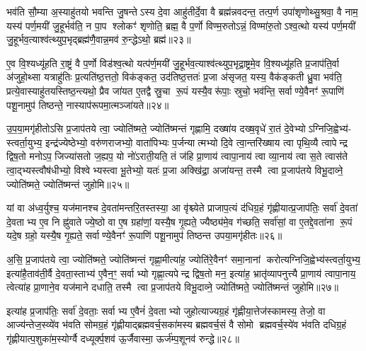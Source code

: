 भव॑ति सौ॒म्या अ॒स्याहु॑तयो भवन्ति जु॒षन्तेऽस्य दे॒वा आहु॑तीर्दे॒वा वै ब्रह्म॑न्नवदन्त॒ तत्प॒र्ण उपा॑शृणोथ्सु॒श्रवा॒ वै नाम॒ यस्य॑ पर्ण॒मयी॑ जु॒हूर्भव॑ति॒ न पा॒प श्लोकꣳ॑ शृणोति॒ ब्रह्म॒ वै प॒र्णो विण्म॒रुतोऽन्नं॒ विण्मा॑रु॒तोऽश्व॒त्थो यस्य॑ पर्ण॒मयी॑ जु॒हूर्भव॒त्याश्व॑त्थ्युप॒भृद्ब्रह्म॑णै॒वान्न॒मव॑ रु॒न्द्धेऽथो॒ ब्रह्म॑॥२३॥

ए॒व वि॒श्यध्यू॑हति रा॒ष्ट्रं वै प॒र्णो विड॑श्व॒त्थो यत्प॑र्ण॒मयी॑ जु॒हूर्भव॒त्याश्व॑त्थ्युप॒भृद्रा॒ष्ट्रमे॒व वि॒श्यध्यू॑हति प्र॒जाप॑ति॒र्वा अ॑जुहो॒थ्सा यत्राहु॑तिः प्र॒त्यति॑ष्ठ॒त्ततो॒ विक॑ङ्कत॒ उद॑तिष्ठ॒त्ततः॑ प्र॒जा अ॑सृजत॒ यस्य॒ वैक॑ङ्कती ध्रु॒वा भव॑ति॒ प्रत्ये॒वास्याहु॑तयस्तिष्ठ॒न्त्यथो॒ प्रैव जा॑यत ए॒तद्वै स्रु॒चा रू॒पं यस्यै॒वरू॑पाः॒ स्रुचो॒ भव॑न्ति॒ सर्वाण्ये॒वैनꣳ॑ रू॒पाणि॑ पशू॒नामुप॑ तिष्ठन्ते॒ नास्याप॑रूपमा॒त्मञ्जा॑यते॥२४॥

{\anuvakamend[{जु॒हूरथो॒ ब्रह्म॑ स्रु॒चा स॒प्तद॑श च॥७॥}]}

उ॒प॒या॒मगृ॑हीतोऽसि प्र॒जाप॑तये त्वा॒ ज्योति॑ष्मते॒ ज्योति॑ष्मन्तं गृह्णामि॒ दख्षा॑य दख्ष॒वृधे॑ रा॒तं दे॒वेभ्योऽग्निजि॒ह्वेभ्य॑- स्त्वर्ता॒युभ्य॒ इन्द्र॑ज्येष्ठेभ्यो॒ वरु॑णराजभ्यो॒ वाता॑पिभ्यः प॒र्जन्यात्मभ्यो दि॒वे त्वा॒न्तरि॑ख्षाय त्वा पृथि॒व्यै त्वापेन्द्र द्विष॒तो मनोऽप॒ जिज्या॑सतो ज॒ह्यप॒ यो नो॑ऽराती॒यति॒ तं ज॑हि प्रा॒णाय॑ त्वापा॒नाय॑ त्वा व्या॒नाय॑ त्वा स॒ते त्वास॑ते त्वा॒द्भ्यस्त्वौष॑धीभ्यो॒ विश्वेभ्यस्त्वा भू॒तेभ्यो॒ यतः॑ प्र॒जा अक्खि॑द्रा॒ अजा॑यन्त॒ तस्मै त्वा प्र॒जाप॑तये विभू॒दाव्ने॒ ज्योति॑ष्मते॒ ज्योति॑ष्मन्तं जुहोमि॥२५॥

{\anuvakamend[{ओष॑धीभ्य॒श्चतु॑र्दश च॥८॥}]}

यां वा अ॑ध्व॒र्युश्च॒ यज॑मानश्च दे॒वता॑मन्तरि॒तस्तस्या॒ आ वृ॑श्च्येते प्राजाप॒त्यं द॑धिग्र॒हं गृ॑ह्णीयात्प्र॒जाप॑तिः॒ सर्वा॑ दे॒वता॑ दे॒वताभ्य ए॒व नि ह्नु॑वाते ज्ये॒ष्ठो वा ए॒ष ग्रहा॑णां॒ यस्यै॒ष गृ॒ह्यते॒ ज्यैष्ठ्य॑मे॒व ग॑च्छति॒ सर्वा॑सां॒ वा ए॒तद्दे॒वता॑ना रू॒पं यदे॒ष ग्रहो॒ यस्यै॒ष गृ॒ह्यते॒ सर्वाण्ये॒वैनꣳ॑ रू॒पाणि॑ पशू॒नामुप॑ तिष्ठन्त उपया॒मगृ॑हीतः॥२६॥

अ॒सि॒ प्र॒जाप॑तये त्वा॒ ज्योति॑ष्मते॒ ज्योति॑ष्मन्तं गृह्णा॒मीत्या॑ह॒ ज्योति॑रे॒वैनꣳ॑ समा॒नानां करोत्यग्निजि॒ह्वेभ्य॑स्त्वर्ता॒युभ्य॒ इत्या॑है॒ताव॑ती॒र्वै दे॒वता॒स्ताभ्य॑ ए॒वैन॒ꣳ॒ सर्वाभ्यो गृह्णा॒त्यपेन्द्र द्विष॒तो मन॒ इत्या॑ह॒ भ्रातृ॑व्यापनुत्त्यै प्रा॒णाय॑ त्वापा॒नाय॒ त्वेत्या॑ह प्रा॒णाने॒व यज॑माने दधाति॒ तस्मै त्वा प्र॒जाप॑तये विभू॒दाव्ने॒ ज्योति॑ष्मते॒ ज्योति॑ष्मन्तं जुहोमि॥२७॥

इत्या॑ह प्र॒जाप॑तिः॒ सर्वा॑ दे॒वताः॒ सर्वाभ्य ए॒वैनं॑ दे॒वताभ्यो जुहोत्याज्यग्र॒हं गृ॑ह्णीया॒त्तेज॑स्कामस्य॒ तेजो॒ वा आज्य॑न्तेज॒स्व्ये॑व भ॑वति सोमग्र॒हं गृ॑ह्णीयाद्ब्रह्मवर्च॒सका॑मस्य ब्रह्मवर्च॒सं वै सोमो ब्रह्मवर्च॒स्ये॑व भ॑वति दधिग्र॒हं गृ॑ह्णीयात्प॒शुका॑म॒स्योर्ग्वै दध्यूर्क्प॒शव॑ ऊ॒र्जैवास्मा॒ ऊर्ज॑म्प॒शूनव॑ रुन्द्धे॥२८॥

